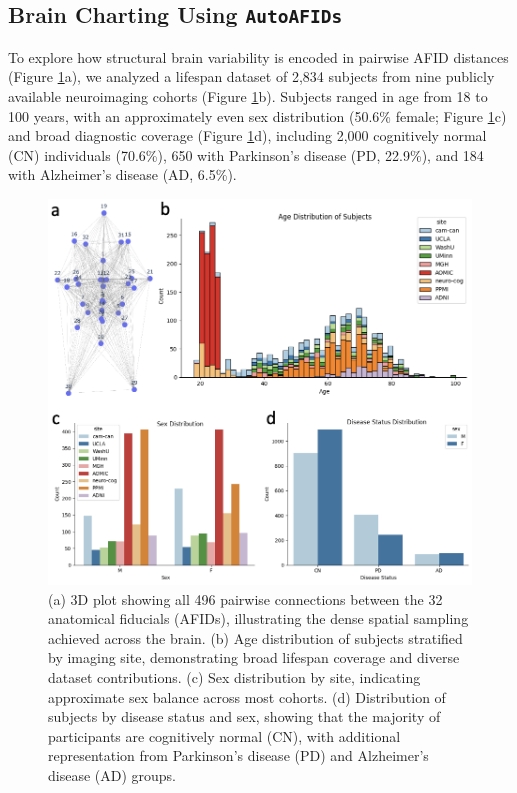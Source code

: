 \subsection{Brain Charting Using \texttt{AutoAFIDs}}

To explore how structural brain variability is encoded in pairwise AFID distances (Figure \ref{fig:ch3_Figure_pairwisedata}a), we analyzed a lifespan dataset of 2,834 subjects from nine publicly available neuroimaging cohorts (Figure \ref{fig:ch3_Figure_pairwisedata}b). Subjects ranged in age from 18 to 100 years, with an approximately even sex distribution (50.6\% female; Figure \ref{fig:ch3_Figure_pairwisedata}c) and broad diagnostic coverage (Figure \ref{fig:ch3_Figure_pairwisedata}d), including 2,000 cognitively normal (CN) individuals (70.6\%), 650 with Parkinson’s disease (PD, 22.9\%), and 184 with Alzheimer’s disease (AD, 6.5\%).

\begin{figure}[hbt!]
    \centering
    \includegraphics[width=0.80\linewidth]{figs/ch3_Figure_pairwisedata.png}
    \caption{(a) 3D plot showing all 496 pairwise connections between the 32 anatomical fiducials (AFIDs), illustrating the dense spatial sampling achieved across the brain. (b) Age distribution of subjects stratified by imaging site, demonstrating broad lifespan coverage and diverse dataset contributions. (c) Sex distribution by site, indicating approximate sex balance across most cohorts. (d) Distribution of subjects by disease status and sex, showing that the majority of participants are cognitively normal (CN), with additional representation from Parkinson’s disease (PD) and Alzheimer’s disease (AD) groups.
}
    \label{fig:ch3_Figure_pairwisedata}
\end{figure}

